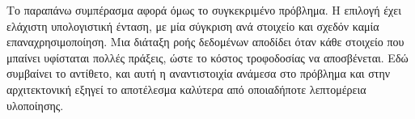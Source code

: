Το παραπάνω συμπέρασμα αφορά όμως το συγκεκριμένο πρόβλημα. Η επιλογή
 έχει ελάχιστη υπολογιστική ένταση, με μία σύγκριση ανά στοιχείο και
σχεδόν καμία επαναχρησιμοποίηση. Μια διάταξη ροής δεδομένων αποδίδει όταν κάθε
στοιχείο που μπαίνει υφίσταται πολλές πράξεις, ώστε το κόστος τροφοδοσίας να
αποσβένεται. Εδώ συμβαίνει το αντίθετο, και αυτή η αναντιστοιχία ανάμεσα στο
πρόβλημα και στην αρχιτεκτονική εξηγεί το αποτέλεσμα καλύτερα από οποιαδήποτε
λεπτομέρεια υλοποίησης.
